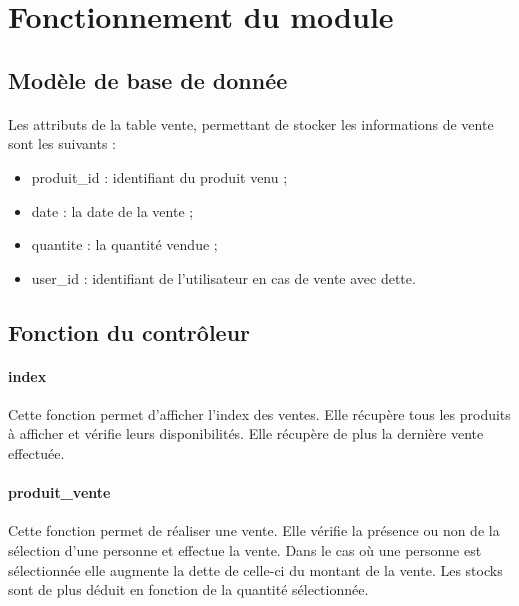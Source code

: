 \documentclass[twoside,UTF8]{EPURapport}
\begin{document}
    \section{Fonctionnement du module}

        \subsection{Modèle de base de donnée}

            \paragraph{}Les attributs de la table vente, permettant de stocker les informations de vente sont les suivants :\\
            \begin{itemize}
                \item produit\_id : identifiant du produit venu ;\\
                \item date : la date de la vente ;\\
                \item quantite : la quantité vendue ;\\
                \item user\_id : identifiant de l'utilisateur en cas de vente avec dette.
            \end{itemize}

        \subsection{Fonction du contrôleur}

            \paragraph{index}Cette fonction permet d'afficher l'index des ventes. Elle récupère tous les produits à afficher et vérifie leurs disponibilités. Elle récupère de plus la dernière vente effectuée.

            \paragraph{produit\_vente}Cette fonction permet de réaliser une vente. Elle vérifie la présence ou non de la sélection d'une personne et effectue la vente. Dans le cas où une personne est sélectionnée elle augmente la dette de celle-ci du montant de la vente. Les stocks sont de plus déduit en fonction de la quantité sélectionnée.
\end{document}

